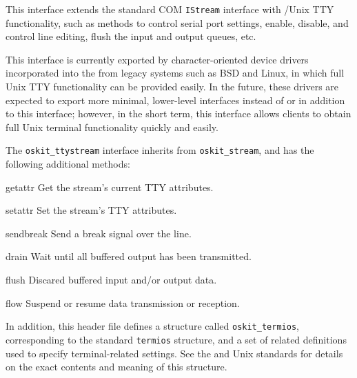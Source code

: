 \label{oskit-ttystream}

This interface extends the standard COM \texttt{IStream} interface
with \posix/Unix TTY functionality,
such as methods to control serial port settings,
enable, disable, and control line editing,
flush the input and output queues, etc.

This interface is currently exported by character-oriented device drivers
incorporated into the \oskit{} from legacy systems such as BSD and Linux,
in which full Unix TTY functionality can be provided easily.
In the future,
these drivers are expected to export more minimal, lower-level interfaces
instead of or in addition to this interface;
however, in the short term,
this interface allows clients
to obtain full Unix terminal functionality quickly and easily.

The {\tt oskit_ttystream} interface inherits from {\tt oskit_stream},
and has the following additional methods:	
\begin{csymlist}
\item[getattr]
	Get the stream's current TTY attributes.
\item[setattr]
	Set the stream's TTY attributes.
\item[sendbreak]
	Send a break signal over the line.
\item[drain]
	Wait until all buffered output has been transmitted.
\item[flush]
	Discared buffered input and/or output data.
\item[flow]
	Suspend or resume data transmission or reception.
\end{csymlist}

In addition,
this header file defines a structure called \texttt{oskit_termios},
corresponding to the standard \posix{} \texttt{termios} structure,
and a set of related definitions
used to specify terminal-related settings.
See the \posix{} and Unix standards
for details on the exact contents and meaning of this structure.

